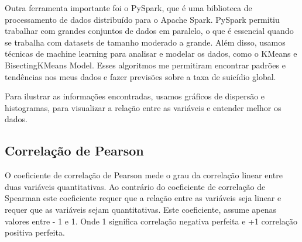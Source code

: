 \documentclass{article}
\begin{document}
Outra ferramenta importante foi o PySpark, que é uma biblioteca de processamento de dados distribuído para o Apache Spark. PySpark  permitiu trabalhar com grandes conjuntos de dados em paralelo, o que é essencial quando se trabalha com datasets de tamanho moderado a grande. Além disso, usamos técnicas de machine learning para analisar e modelar os dados, como o KMeans e BisectingKMeans Model. Esses algoritmos me permitiram encontrar padrões e tendências nos meus dados e fazer previsões sobre a taxa de suicídio global.

Para ilustrar as informações encontradas, usamos gráficos de dispersão e histogramas, para visualizar a relação entre as variáveis e entender melhor os dados.

\newpage
\subsection{Correlação de Pearson}
O coeficiente de correlação de Pearson mede o grau da correlação linear entre duas variáveis quantitativas. Ao contrário do coeficiente de correlação de Spearman este coeficiente requer que a relação entre as variáveis seja linear e requer que as variáveis sejam quantitativas.
\newline
Este coeficiente, assume apenas valores entre - 1 e 1. Onde 1 significa correlação negativa perfeita e +1 correlação positiva perfeita.
\bigskip
\end{document}
